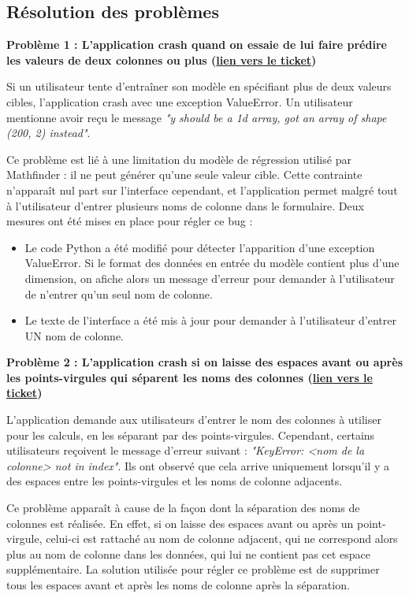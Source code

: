 \documentclass[french]{article}
\begin{document}
    \subsection{Résolution des problèmes}
    \textbf{Problème 1 : L'application crash quand on essaie de lui faire prédire les valeurs de deux colonnes ou plus (\href{https://github.com/vinpap/mathfinder/issues/2}{lien vers le ticket})}

    Si un utilisateur tente d'entraîner son modèle en spécifiant plus de deux valeurs cibles, l'application crash avec une exception ValueError. Un utilisateur mentionne avoir reçu le message \textit{"y should be a 1d array, got an array of shape (200, 2) instead"}.

    Ce problème est lié à une limitation du modèle de régression utilisé par Mathfinder : il ne peut générer qu'une seule valeur cible. Cette contrainte n'apparaît nul part sur l'interface cependant, et l'application permet malgré tout à l'utilisateur d'entrer plusieurs noms de colonne dans le formulaire. Deux mesures ont été mises en place pour régler ce bug :
    \begin{itemize}
        \item Le code Python a été modifié pour détecter l'apparition d'une exception ValueError. Si le format des données en entrée du modèle contient plus d'une dimension, on afiche alors un message d'erreur pour demander à l'utilisateur de n'entrer qu'un seul nom de colonne.
        \item Le texte de l'interface a été mis à jour pour demander à l'utilisateur d'entrer UN nom de colonne.
    \end{itemize}

    \textbf{Problème 2 : L'application crash si on laisse des espaces avant ou après les points-virgules qui séparent les noms des colonnes (\href{https://github.com/vinpap/mathfinder/issues/3}{lien vers le ticket})}

    L'application demande aux utilisateurs d'entrer le nom des colonnes à utiliser pour les calculs, en les séparant par des points-virgules. Cependant, certains utilisateurs reçoivent le message d'erreur suivant : \textit{"KeyError: <nom de la colonne> not in index"}. Ils ont observé que cela arrive uniquement lorsqu'il y a des espaces entre les points-virgules et les noms de colonne adjacents.

    Ce problème apparaît à cause de la façon dont la séparation des noms de colonnes est réalisée. En effet, si on laisse des espaces avant ou après un point-virgule, celui-ci est rattaché au nom de colonne adjacent, qui ne correspond alors plus au nom de colonne dans les données, qui lui ne contient pas cet espace supplémentaire. La solution utilisée pour régler ce problème est de supprimer tous les espaces avant et après les noms de colonne après la séparation. 
\end{document}

